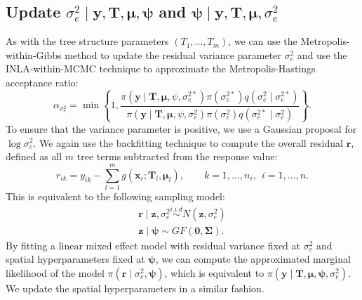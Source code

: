 \documentclass{article}
\begin{document}
\subsection{Update \texorpdfstring{$\sigma_e^2 \mid \boldsymbol{y}, \mathbf{T}, \boldsymbol{\mu}, \boldsymbol{\psi}$}{u3} and \texorpdfstring{$\boldsymbol{\psi} \mid \boldsymbol{y}, \mathbf{T}, \boldsymbol{\mu}, \sigma_e^2$}{u4}}
As with the tree structure parameters $(T_1, \dots, T_m)$, we can use the Metropolis-within-Gibbs method to update the residual variance parameter $\sigma_e^2$ and use the INLA-within-MCMC technique to approximate the Metropolis-Hastings acceptance ratio:%
$$
\alpha_{\sigma_e^2}=\min \left\{1, \frac{\pi\left(\boldsymbol{y} \mid \mathbf{T}, \boldsymbol{\mu}, \psi, \sigma_e^{2 *}\right) \pi\left(\sigma_e^{2 *}\right)q\left(\sigma_e^{2} \mid \sigma_e^{2 *}\right)}{\pi\left(\boldsymbol{y} \mid \mathbf{T}, \boldsymbol{\mu}, \psi, \sigma_e^{2}\right) \pi\left(\sigma_e^{2}\right)q\left(\sigma_e^{2 *} \mid \sigma_e^{2}\right)} \right\}.
$$
To ensure that the variance parameter is positive, we use a Gaussian proposal for $\log \sigma_e^2$. We again use the backfitting technique to compute the overall residual $\boldsymbol{r}$, defined as all $m$ tree terms subtracted from the response value:
$$
r_{ik}=y_{ik}-\sum_{l = 1}^m g\left(\boldsymbol{x}_i ; \mathbf{T}_l, \boldsymbol{\mu}_l\right), \qquad k=1,\ldots, n_i,~~ i=1, \ldots, n.
$$
This is equivalent to the following sampling model:
$$
\begin{gathered}
\boldsymbol{r} \mid \boldsymbol{z}, \sigma_e^2 \stackrel{i . i . d}{\sim} N\left(\boldsymbol{z}, \sigma_e^2\right) \\
\boldsymbol{z} \mid \boldsymbol{\psi} \sim G F(\boldsymbol{0}, \boldsymbol{\Sigma}).
\end{gathered}
$$
By fitting a linear mixed effect model with residual variance fixed at $\sigma_e^2$ and spatial hyperparameters fixed at $\boldsymbol{\psi}$, we can compute the approximated marginal likelihood of the model $\pi(\boldsymbol{r} \mid \sigma_e^2, \boldsymbol{\psi})$, which is equivalent to $\pi\left(\boldsymbol{y} \mid \mathbf{T}, \boldsymbol{\mu}, \boldsymbol{\psi}, \sigma_e^{2}\right)$. We update the spatial hyperparameters in a similar fashion. 
\end{document}
